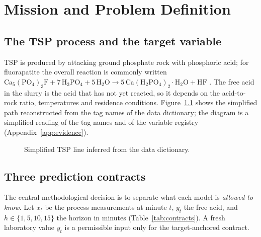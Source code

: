\chapter{Mission and Problem Definition}\label{ch:context}

\section{The TSP process and the target variable}
TSP is produced by attacking ground phosphate rock with phosphoric acid; for fluorapatite the overall reaction is commonly written $\mathrm{Ca_5(PO_4)_3F}+7\,\mathrm{H_3PO_4}+5\,\mathrm{H_2O}\rightarrow5\,\mathrm{Ca(H_2PO_4)_2\cdot H_2O}+\mathrm{HF}$ \citep{ifdc1998}. The free acid in the slurry is the acid that has not yet reacted, so it depends on the acid-to-rock ratio, temperatures and residence conditions. Figure~\ref{fig:process} shows the simplified path reconstructed from the tag names of the data dictionary; the diagram is a simplified reading of the tag names and of the variable registry (Appendix~\ref{app:evidence}).

\begin{figure}[!htbp]\centering
{}
\caption{Simplified TSP line inferred from the data dictionary.}\label{fig:process}
\end{figure}

\section{Three prediction contracts}
The central methodological decision is to separate what each model is \emph{allowed to know}. Let $x_{t}$ be the process measurements at minute $t$, $y_t$ the free acid, and $h\in\{1,5,10,15\}$ the horizon in minutes (Table~\ref{tab:contracts}). A fresh laboratory value $y_t$ is a permissible input only for the target-anchored contract.

